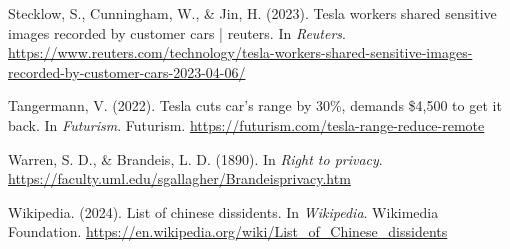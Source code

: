 \documentclass[11pt]{article}
\begin{document}
\begin{hangparas}{1.5em}{1}
\hypertarget{citeproc_bib_item_10}{Stecklow, S., Cunningham, W., \& Jin, H. (2023). Tesla workers shared sensitive images recorded by customer cars | reuters. In \textit{Reuters}. \url{https://www.reuters.com/technology/tesla-workers-shared-sensitive-images-recorded-by-customer-cars-2023-04-06/}}

\hypertarget{citeproc_bib_item_11}{Tangermann, V. (2022). Tesla cuts car’s range by 30\%, demands \$4,500 to get it back. In \textit{Futurism}. Futurism. \url{https://futurism.com/tesla-range-reduce-remote}}

\hypertarget{citeproc_bib_item_12}{Warren, S. D., \& Brandeis, L. D. (1890). In \textit{Right to privacy}. \url{https://faculty.uml.edu/sgallagher/Brandeisprivacy.htm}}

\hypertarget{citeproc_bib_item_13}{Wikipedia. (2024). List of chinese dissidents. In \textit{Wikipedia}. Wikimedia Foundation. \url{https://en.wikipedia.org/wiki/List_of_Chinese_dissidents}}\bigskip
\end{hangparas}
\end{document}
